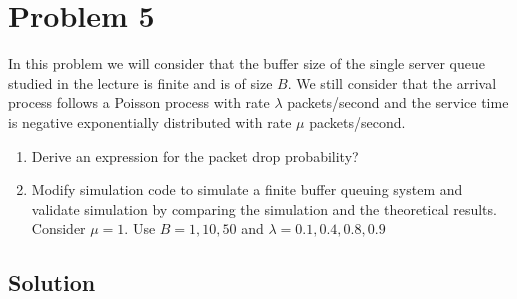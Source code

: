 
\section*{Problem 5}
In this problem we will consider that the buffer size of the single server queue studied in the lecture is finite and is of size $B$.
We still consider that the arrival process follows a Poisson process with rate $\lambda$ packets/second and the service time is negative exponentially distributed with rate $\mu$ packets/second.

\begin{enumerate}
    \item Derive an expression for the packet drop probability?
    \item Modify simulation code to simulate a finite buffer queuing system and validate simulation by comparing the simulation and the theoretical results.
          Consider $\mu = 1$. Use $B = 1, 10, 50$ and $\lambda = 0.1, 0.4, 0.8, 0.9$
\end{enumerate}

\subsection*{Solution}

